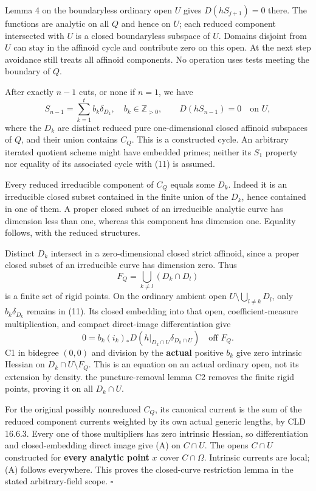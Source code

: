 \documentclass[
  10pt,
]{article}
\begin{document}
Lemma 4 on the boundaryless ordinary open \(U\) gives \(D(hS_{j+1})=0\)
there. The functions are analytic on all \(Q\) and hence on \(U\); each
reduced component intersected with \(U\) is a closed boundaryless
subspace of \(U\). Domains disjoint from \(U\) can stay in the affinoid
cycle and contribute zero on this open. At the next step avoidance still
treats all affinoid components. No operation uses tests meeting the
boundary of \(Q\).

After exactly \(n-1\) cuts, or none if \(n=1\), we have \[
 S_{n-1}=\sum_{k=1}^t b_k\delta_{D_k},\quad b_k\in\mathbb Z_{>0},
 \qquad D(hS_{n-1})=0\quad\text{on }U,                    \tag{11}
\] where the \(D_k\) are distinct reduced pure one-dimensional closed
affinoid subspaces of \(Q\), and their union contains \(C_Q\). This is a
constructed cycle. An arbitrary iterated quotient scheme might have
embedded primes; neither its \(S_1\) property nor equality of its
associated cycle with (11) is assumed.

Every reduced irreducible component of \(C_Q\) equals some \(D_k\).
Indeed it is an irreducible closed subset contained in the finite union
of the \(D_k\), hence contained in one of them. A proper closed subset
of an irreducible analytic curve has dimension less than one, whereas
this component has dimension one. Equality follows, with the reduced
structures.

Distinct \(D_k\) intersect in a zero-dimensional closed strict affinoid,
since a proper closed subset of an irreducible curve has dimension zero.
Thus \[
 F_Q=\bigcup_{k\ne l}(D_k\cap D_l)
\] is a finite set of rigid points. On the ordinary ambient open
\(U\setminus\bigcup_{l\ne k}D_l\), only \(b_k\delta_{D_k}\) remains in
(11). Its closed embedding into that open, coefficient-measure
multiplication, and compact direct-image differentiation give \[
 0=b_k(i_k)_*D(h|_{D_k\cap U}\delta_{D_k\cap U})
 \quad\text{off }F_Q.
\] C1 in bidegree \((0,0)\) and division by the \textbf{actual} positive
\(b_k\) give zero intrinsic Hessian on \(D_k\cap U\setminus F_Q\). This
is an equation on an actual ordinary open, not its extension by density.
the puncture-removal lemma C2 removes the finite rigid points, proving
it on all \(D_k\cap U\).

For the original possibly nonreduced \(C_Q\), its canonical current is
the sum of the reduced component currents weighted by its own actual
generic lengths, by CLD 16.6.3. Every one of those multipliers has zero
intrinsic Hessian, so differentiation and closed-embedding direct image
give (A) on \(C\cap U\). The opens \(C\cap U\) constructed for
\textbf{every analytic point} \(x\) cover \(C\cap\Omega\). Intrinsic
currents are local; (A) follows everywhere. This proves the closed-curve
restriction lemma in the stated arbitrary-field scope. \(\square\)
\end{document}

